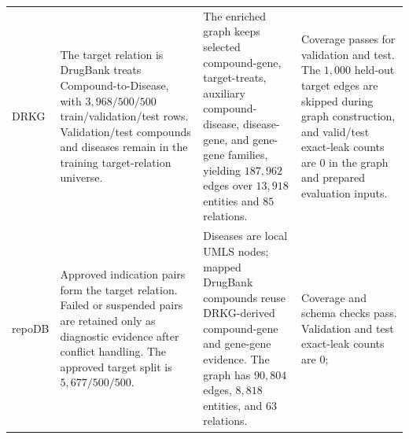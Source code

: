 \documentclass[11pt]{article}
\begin{document}
\begin{table}[H]
\begin{tabularx}{\textwidth}{L{0.12\textwidth} Y Y Y}
    \addlinespace
    DRKG &
    The target relation is DrugBank treats Compound-to-Disease, with \(3{,}968/500/500\) train/validation/test rows. Validation/test compounds and diseases remain in the training target-relation universe. &
    The enriched graph keeps selected compound-gene, target-treats, auxiliary compound-disease, disease-gene, and gene-gene families, yielding \(187{,}962\) edges over \(13{,}918\) entities and \(85\) relations. &
    Coverage passes for validation and test. The \(1{,}000\) held-out target edges are skipped during graph construction, and valid/test exact-leak counts are \(0\) in the graph and prepared evaluation inputs. \\
    \addlinespace
    repoDB &
    Approved indication pairs form the target relation. Failed or suspended pairs are retained only as diagnostic evidence after conflict handling. The approved target split is \(5{,}677/500/500\). &
    Diseases are local UMLS nodes; mapped DrugBank compounds reuse DRKG-derived compound-gene and gene-gene evidence. The graph has \(90{,}804\) edges, \(8{,}818\) entities, and \(63\) relations. &
    Coverage and schema checks pass. Validation and test exact-leak counts are \(0\);  \\
    \bottomrule
    \end{tabularx}
    \end{table}
    \FloatBarrier

    

    
    
    
\end{document}

